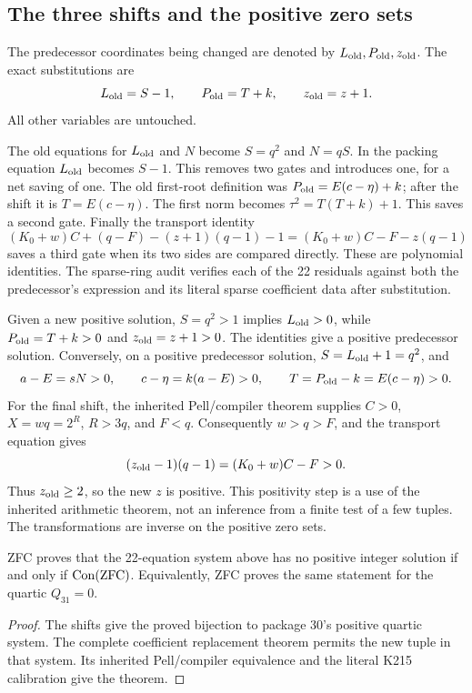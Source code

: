\subsection{The three shifts and the positive zero sets}

The predecessor coordinates being changed are denoted by
$L_{\rm old},P_{\rm old},z_{\rm old}$. The exact substitutions are
\[
 L_{\rm old}=S-1,\qquad P_{\rm old}=T+k,
 \qquad z_{\rm old}=z+1.
\]
All other variables are untouched.

The old equations for $L_{\rm old}$ and $N$ become $S=q^2$ and
$N=qS$. In the packing equation $L_{\rm old}$ becomes $S-1$.
This removes two gates and introduces one, for a net saving of one.
The old first-root definition was
$P_{\rm old}=E(c-\eta)+k$; after the shift it is
$T=E(c-\eta)$. The first norm becomes $\tau^2=T(T+k)+1$.
This saves a second gate. Finally the transport identity
\[
 (K_0+w)C+(q-F)-(z+1)(q-1)-1
       =(K_0+w)C-F-z(q-1)
\]
saves a third gate when its two sides are compared directly.
These are polynomial identities. The sparse-ring audit verifies each of
the 22 residuals against both the predecessor's expression and its
literal sparse coefficient data after substitution.

Given a new positive solution, $S=q^2>1$ implies
$L_{\rm old}>0$, while $P_{\rm old}=T+k>0$ and
$z_{\rm old}=z+1>0$. The identities give a positive predecessor solution.
Conversely, on a positive predecessor solution,
$S=L_{\rm old}+1=q^2$, and
\[
 a-E=sN>0,\qquad c-\eta=k(a-E)>0,
 \qquad T=P_{\rm old}-k=E(c-\eta)>0.
\]
For the final shift, the inherited Pell/compiler theorem supplies
$C>0$, $X=wq=2^R$, $R>3q$, and $F<q$.
Consequently $w>q>F$, and the transport equation gives
\[
 (z_{\rm old}-1)(q-1)=(K_0+w)C-F>0.
\]
Thus $z_{\rm old}\ge2$, so the new $z$ is positive.
This positivity step is a use of the inherited arithmetic theorem,
not an inference from a finite test of a few tuples.
The transformations are inverse on the positive zero sets.

\begin{theorem}
ZFC proves that the 22-equation system above has no positive integer
solution if and only if $\operatorname{Con}(\mathrm{ZFC})$. Equivalently, ZFC proves the
same statement for the quartic $Q_{31}=0$.
\end{theorem}
\begin{proof}
The shifts give the proved bijection to package 30's positive quartic
system. The complete coefficient replacement theorem permits the new
tuple in that system. Its inherited Pell/compiler equivalence and
the literal K215 calibration give the theorem.
\end{proof}


